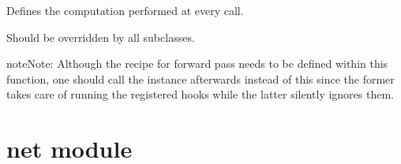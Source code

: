 \documentclass[letterpaper,10pt,english]{sphinxmanual}
\begin{document}
\begin{fulllineitems}
\begin{fulllineitems}
\label{\detokenize{model:model._NonLocalBlockND._is_full_backward_hook}}
\pysigstartsignatures
{}
\pysigstopsignatures
\end{fulllineitems}


\begin{fulllineitems}
\label{\detokenize{model:model._NonLocalBlockND.forward}}
\pysigstartsignatures
{}
\pysigstopsignatures
\sphinxAtStartPar
Defines the computation performed at every call.

\sphinxAtStartPar
Should be overridden by all subclasses.

\begin{sphinxadmonition}{note}{Note:}
\sphinxAtStartPar
Although the recipe for forward pass needs to be defined within
this function, one should call the  instance afterwards
instead of this since the former takes care of running the
registered hooks while the latter silently ignores them.
\end{sphinxadmonition}

\end{fulllineitems}


\begin{fulllineitems}
\label{\detokenize{model:model._NonLocalBlockND.training}}
\pysigstartsignatures
{}
\pysigstopsignatures
\end{fulllineitems}


\end{fulllineitems}


\sphinxstepscope


\section{net module}
\label{\detokenize{net:module-net}}\label{\detokenize{net:net-module}}\label{\detokenize{net::doc}}
\end{document}
